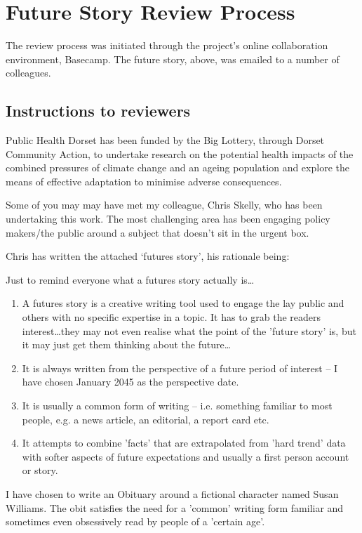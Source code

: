 \section{Future Story Review Process}
The review process was initiated through the project's online collaboration environment, Basecamp. The future story, above, was emailed to a number of colleagues.
\subsection{Instructions to reviewers}
Public Health Dorset has been funded by the Big Lottery, through Dorset Community Action, to undertake research on the potential health impacts of the combined pressures of climate change and an ageing population and explore the means of effective adaptation to minimise adverse consequences.
 
Some of you may may have met my colleague, Chris Skelly, who has been undertaking this work.  The most challenging area has been engaging policy makers/the public around a subject that doesn't sit in the urgent box.
 
Chris has written the attached `futures story', his rationale being:

Just to remind everyone what a futures story actually is\ldots

\begin{enumerate}
\item A futures story is a creative writing tool used to engage the lay public and others with no specific expertise in a topic. It has to grab the readers interest\ldots they may not even realise what the point of the 'future story' is, but it may just get them thinking about the future\ldots
\item It is always written from the perspective of a future period of interest -- I have chosen January 2045 as the perspective date.
\item It is usually a common form of writing -- i.e. something familiar to most people, e.g. a news article, an editorial, a report card etc.
\item It attempts to combine 'facts' that are extrapolated from 'hard trend' data with softer aspects of future expectations and usually a first person account or story.
\end{enumerate}

I have chosen to write an Obituary around a fictional character named Susan Williams. The obit satisfies the need for a 'common' writing form familiar and sometimes even obsessively read by people of a 'certain age'.

